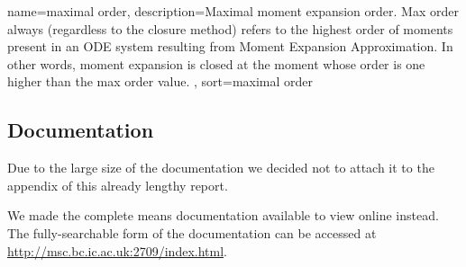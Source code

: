 \documentclass[11pt,a4paper]{article}
\begin{document}
\pagebreak %
\tableofcontents


{
  name=maximal order,
  description={Maximal moment expansion order. Max order always (regardless to the closure method) refers to the highest order of 
  moments present in an ODE system resulting from Moment Expansion Approximation. In other words, moment expansion is closed at the moment whose order is one higher than the max order value.
   },
  sort=maximal order
}
\newpage{}
\printglossaries

\newpage{}

\newpage

\newpage{}

\newpage{}

\newpage{}

\newpage{}
{}


\newpage{}
\begin{appendices}
\section{Documentation}
\label{sec:documentation}

Due to the large size of the documentation we decided not to attach it to the appendix of this already lengthy report.

We made the complete means documentation available to view online instead. The fully-searchable form of the documentation can be accessed at \\
\url{http://msc.bc.ic.ac.uk:2709/index.html}.

\end{appendices}
   
\end{document}
